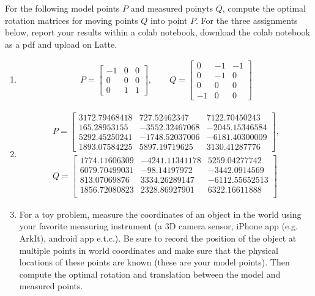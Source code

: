 \begin{homework}
	For the following model points $P$ and measured poinyts $Q$, compute the optimal rotation matrices for moving points $Q$ into point $P$. 
	For the three assignments below, report your results within a colab notebook, download the colab notebook as a pdf and upload on Latte.
	\begin{enumerate}
		\item  \begin{align}
			P = \begin{bmatrix}
			-1 & 0 & 0 \\
			0 & 0 & 0 \\
			0 & 1 & 1
			\end{bmatrix},
			\qquad 
			Q = \begin{bmatrix}
			0 & -1 & -1 \\
			0 & -1 & 0 \\
			0 & 0 & 0 \\
			-1 & 0 & 0
			\end{bmatrix}
		\end{align}
		\item \begin{align}
			P = \begin{bmatrix}
			3172.79468418  &  727.52462347  & 7122.70450243 \\
			165.28953155 &  -3552.32467068 & -2045.15346584 \\
			5292.45250241 & -1748.52037006 & -6181.40300009 \\
			1893.07584225  & 5897.19719625  & 3130.41287776
			\end{bmatrix}, 
			\\
			Q = \begin{bmatrix}
			1774.11606309 & -4241.11341178  & 5259.04277742 \\
			6079.70499031  &  -98.14197972 & -3442.0914569 \\
			813.07069876  & 3334.26289147 & -6112.55652513 \\
			1856.72080823 &  2328.86927901  & 6322.16611888 \\
			\end{bmatrix} \nonumber
		\end{align}
		\item For a toy problem, measure the coordinates of an object in the world using your favorite measuring instrument (a 3D camera sensor, iPhone app (e.g. ArkIt), android app e.t.c.). Be sure to record the position of the object at multiple points in world coordinates and make sure that the physical locations of these points are known (these are your model points). Then compute the optimal rotation and translation between the model and measured points.
	\end{enumerate}
\end{homework}


